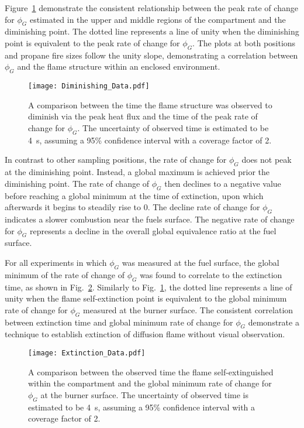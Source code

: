\documentclass[12pt,letterpaper]{article}
\begin{document}
\begin{flushleft}
Figure~\ref{fig:Dim_plot} demonstrate the consistent relationship between the peak rate of change for $\phi_{G}$ estimated in the upper and middle regions of the compartment and the diminishing point. The dotted line represents a line of unity when the diminishing point is equivalent to the peak rate of change for $\phi_{G}$. The plots at both positions and propane fire sizes follow the unity slope, demonstrating a correlation between $\phi_{G}$ and the flame structure within an enclosed environment.
\begin{figure}[!]
	\centering
\texttt{[image: Diminishing\_Data.pdf]}
	\caption{A comparison between the time the flame structure was observed to diminish via the peak heat flux and the time of the peak rate of change for $\phi_{G}$. The uncertainty of observed time is estimated to be 4~s, assuming a 95\% confidence interval with a coverage factor of 2.}
	\label{fig:Dim_plot}
\end{figure}

In contrast to other sampling positions, the rate of change for $\phi_{G}$ does not peak at the diminishing point. Instead, a global maximum is achieved prior the diminishing point. The rate of change of $\phi_{G}$ then declines to a negative value before reaching a global minimum at the time of extinction, upon which afterwards it begins to steadily rise to 0. The decline rate of change for $\phi_{G}$ indicates a slower combustion near the fuels surface. The negative rate of change for $\phi_{G}$ represents a decline in the overall global equivalence ratio at the fuel surface. 

For all experiments in which $\phi_{G}$ was measured at the fuel surface, the global minimum of the rate of change of $\phi_{G}$ was found to correlate to the extinction time, as shown in Fig.~\ref{fig:Ext_plot}. Similarly to Fig.~\ref{fig:Dim_plot}, the dotted line represents a line of unity when the flame self-extinction point is equivalent to the global minimum rate of change for $\phi_{G}$ measured at the burner surface. The consistent correlation between extinction time and global minimum rate of change for $\phi_{G}$ demonstrate a technique to establish extinction of diffusion flame without visual observation. 
\begin{figure}[!]
	\centering
\texttt{[image: Extinction\_Data.pdf]}
	\caption{A comparison between the observed time the flame self-extinguished within the compartment and the global minimum rate of change for $\phi_{G}$ at the burner surface. The uncertainty of observed time is estimated to be 4~s, assuming a 95\% confidence interval with a coverage factor of 2.}
	\label{fig:Ext_plot}
\end{figure}


\end{flushleft}
\end{document}
